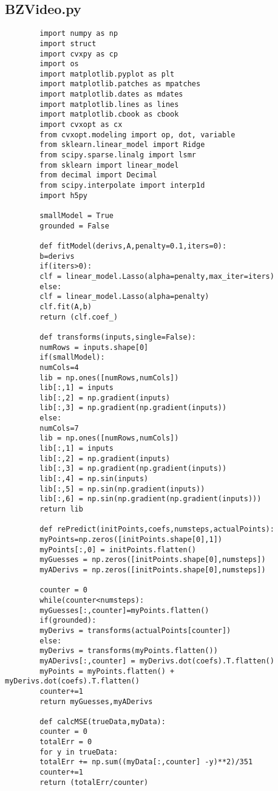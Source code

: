 \documentclass[12pt]{article}
\begin{document}
	\subsection{BZVideo.py}
	\begin{verbatim}
		import numpy as np
		import struct
		import cvxpy as cp
		import os
		import matplotlib.pyplot as plt
		import matplotlib.patches as mpatches
		import matplotlib.dates as mdates
		import matplotlib.lines as lines
		import matplotlib.cbook as cbook
		import cvxopt as cx
		from cvxopt.modeling import op, dot, variable
		from sklearn.linear_model import Ridge
		from scipy.sparse.linalg import lsmr
		from sklearn import linear_model
		from decimal import Decimal
		from scipy.interpolate import interp1d
		import h5py
		
		smallModel = True
		grounded = False
		
		def fitModel(derivs,A,penalty=0.1,iters=0):
		b=derivs
		if(iters>0):
		clf = linear_model.Lasso(alpha=penalty,max_iter=iters)
		else:
		clf = linear_model.Lasso(alpha=penalty)
		clf.fit(A,b)
		return (clf.coef_)
		
		def transforms(inputs,single=False):
		numRows = inputs.shape[0]
		if(smallModel):
		numCols=4
		lib = np.ones([numRows,numCols])
		lib[:,1] = inputs
		lib[:,2] = np.gradient(inputs)
		lib[:,3] = np.gradient(np.gradient(inputs))
		else:
		numCols=7
		lib = np.ones([numRows,numCols])
		lib[:,1] = inputs
		lib[:,2] = np.gradient(inputs)
		lib[:,3] = np.gradient(np.gradient(inputs))
		lib[:,4] = np.sin(inputs)
		lib[:,5] = np.sin(np.gradient(inputs))
		lib[:,6] = np.sin(np.gradient(np.gradient(inputs)))
		return lib
		
		def rePredict(initPoints,coefs,numsteps,actualPoints):
		myPoints=np.zeros([initPoints.shape[0],1])
		myPoints[:,0] = initPoints.flatten()
		myGuesses = np.zeros([initPoints.shape[0],numsteps])
		myADerivs = np.zeros([initPoints.shape[0],numsteps])
		
		counter = 0
		while(counter<numsteps):
		myGuesses[:,counter]=myPoints.flatten()
		if(grounded):
		myDerivs = transforms(actualPoints[counter])
		else:
		myDerivs = transforms(myPoints.flatten())
		myADerivs[:,counter] = myDerivs.dot(coefs).T.flatten()
		myPoints = myPoints.flatten() + myDerivs.dot(coefs).T.flatten()
		counter+=1
		return myGuesses,myADerivs
		
		def calcMSE(trueData,myData):
		counter = 0
		totalErr = 0
		for y in trueData:
		totalErr += np.sum((myData[:,counter] -y)**2)/351
		counter+=1
		return (totalErr/counter)
		

\end{verbatim}
\end{document}
